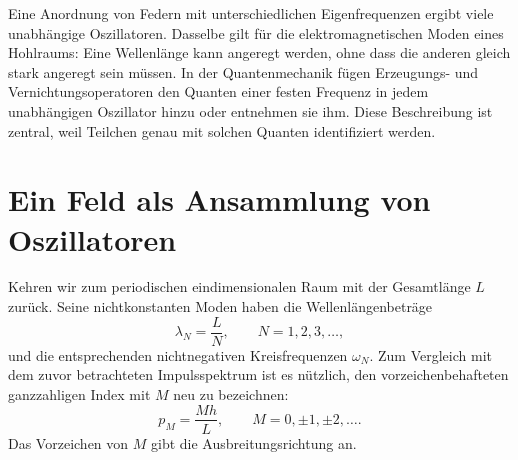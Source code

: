 \begin{classroomqa}\end{classroomqa}

Eine Anordnung von Federn mit unterschiedlichen Eigenfrequenzen ergibt viele unabhängige Oszillatoren. Dasselbe gilt für die elektromagnetischen Moden eines Hohlraums: Eine Wellenlänge kann angeregt werden, ohne dass die anderen gleich stark angeregt sein müssen. In der Quantenmechanik fügen Erzeugungs- und Vernichtungsoperatoren den Quanten einer festen Frequenz in jedem unabhängigen Oszillator hinzu oder entnehmen sie ihm. Diese Beschreibung ist zentral, weil Teilchen genau mit solchen Quanten identifiziert werden.

\section{Ein Feld als Ansammlung von Oszillatoren}

Kehren wir zum periodischen eindimensionalen Raum mit der Gesamtlänge \(L\) zurück. Seine nichtkonstanten Moden haben die Wellenlängenbeträge
\begin{equation}
\lambda_N=\frac{L}{N},
\qquad N=1,2,3,\ldots ,
\end{equation}
und die entsprechenden nichtnegativen Kreisfrequenzen \(\omega_N\). Zum Vergleich mit dem zuvor betrachteten Impulsspektrum ist es nützlich, den vorzeichenbehafteten ganzzahligen Index mit \(M\) neu zu bezeichnen:
\begin{equation}
p_M=\frac{Mh}{L},
\qquad M=0,\pm1,\pm2,\ldots .
\end{equation}
Das Vorzeichen von \(M\) gibt die Ausbreitungsrichtung an.

